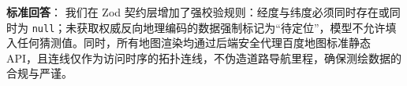 \documentclass[11pt,a4paper,UTF8]{ctexart}
\begin{document}
\vspace{0.6em}

\begin{tcolorbox}[colback=white,colframe=bamboo!70,title=\textbf{Q3：大模型经常捏造不存在的景点和虚假经纬度，你们的系统是如何在算法层面约束的？}]
\small
\textbf{标准回答}：\newline
我们在 Zod 契约层增加了强校验规则：经度与纬度必须同时存在或同时为 \texttt{null}；未获取权威反向地理编码的数据强制标记为“待定位”，模型不允许填入任何猜测值。同时，所有地图渲染均通过后端安全代理百度地图标准静态 API，且连线仅作为访问时序的拓扑连线，不伪造道路导航里程，确保测绘数据的合规与严谨。
\end{tcolorbox}
\end{document}
